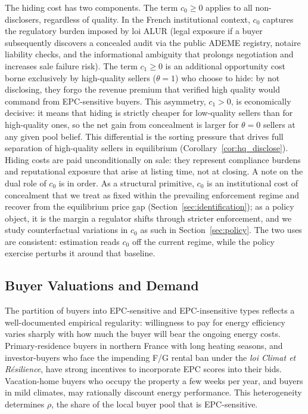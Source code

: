\documentclass[10pt,letterpaper]{bp-template-concise}
\begin{document}
The hiding cost has two components. The term $c_0\geq 0$ applies to all non-disclosers, regardless of quality. In the French institutional context, $c_0$ captures the regulatory burden imposed by loi ALUR (legal exposure if a buyer subsequently discovers a concealed audit via the public ADEME registry, notaire liability checks, and the informational ambiguity that prolongs negotiation and increases sale failure risk). The term $c_1\geq 0$ is an additional opportunity cost borne exclusively by high-quality sellers ($\theta=1$) who choose to hide: by not disclosing, they forgo the revenue premium that verified high quality would command from EPC-sensitive buyers. This asymmetry, $c_1>0$, is economically decisive: it means that hiding is strictly cheaper for low-quality sellers than for high-quality ones, so the net gain from concealment is larger for $\theta=0$ sellers at any given pool belief. This differential is the sorting pressure that drives full separation of high-quality sellers in equilibrium (Corollary~\ref{cor:hq_disclose}). Hiding costs are paid unconditionally on sale: they represent compliance burdens and reputational exposure that arise at listing time, not at closing. A note on the dual role of $c_0$ is in order. As a structural primitive, $c_0$ is an institutional cost of concealment that we treat as fixed within the prevailing enforcement regime and recover from the equilibrium price gap (Section~\ref{sec:identification}); as a policy object, it is the margin a regulator shifts through stricter enforcement, and we study counterfactual variations in $c_0$ as such in Section~\ref{sec:policy}. The two uses are consistent: estimation reads $c_0$ off the current regime, while the policy exercise perturbs it around that baseline.

\subsection{Buyer Valuations and Demand}

The partition of buyers into EPC-sensitive and EPC-insensitive types reflects a well-documented empirical regularity: willingness to pay for energy efficiency varies sharply with how much the buyer will bear the ongoing energy costs. Primary-residence buyers in northern France with long heating seasons, and investor-buyers who face the impending F/G rental ban under the \textit{loi Climat et R\'{e}silience}, have strong incentives to incorporate EPC scores into their bids. Vacation-home buyers who occupy the property a few weeks per year, and buyers in mild climates, may rationally discount energy performance. This heterogeneity determines $\rho$, the share of the local buyer pool that is EPC-sensitive.
\end{document}

